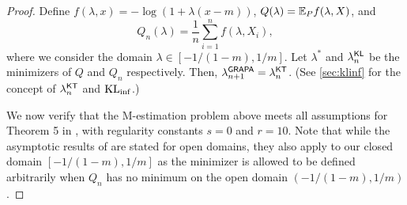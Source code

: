 \begin{proof}
Define $f(\lambda, x) = -\log(1 + \lambda(x - m))$, $Q(\lambda) = \mathbb E_P{f(\lambda, X)}$, and
\begin{equation}
    Q_n(\lambda) = \frac{1}{n} \sum_{i=1}^n f(\lambda, X_i),
\end{equation}
where we consider the domain $\lambda \in [-1/(1-m), 1/m]$. Let $\lambda^*$ and $\lambda^{\mathsf{KL}}_n$ be the minimizers of $Q$ and $Q_n$ respectively. Then, $\lambda^{\mathsf{GRAPA}}_{n+1} = \lambda^{\mathsf{KT}}_n$. (See \cref{sec:klinf} for the concept of $\lambda^{\mathsf{KT}}_n$ and $\operatorname{KL}_{\inf}$.)

We now verify that the M-estimation problem above meets all assumptions for Theorem 5 in \cite{niemiro1992asymptotics}, with regularity constants $s=0$ and $r=10$. Note that while the asymptotic results of \cite{niemiro1992asymptotics} are stated for open domains, they also apply to our closed domain $ [-1/(1-m), 1/m]$ as the minimizer is allowed to be defined arbitrarily when $Q_n$ has no minimum on the open domain $(-1/(1-m), 1/m)$.




\end{proof}
